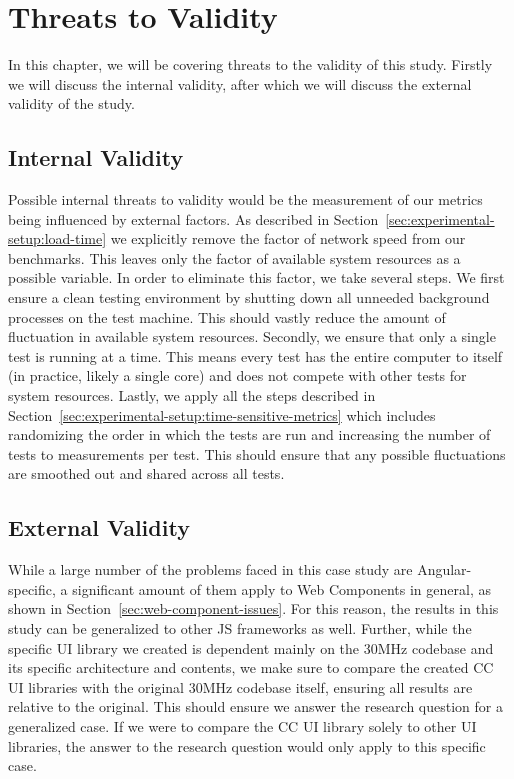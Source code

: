 \chapter{Threats to Validity}\label{chap:threats-to-validity}

In this chapter, we will be covering threats to the validity of this study. Firstly we will discuss the internal validity, after which we will discuss the external validity of the study.

\section{Internal Validity}
Possible internal threats to validity would be the measurement of our metrics being influenced by external factors. As described in Section~\ref{sec:experimental-setup:load-time} we explicitly remove the factor of network speed from our benchmarks. This leaves only the factor of available system resources as a possible variable. In order to eliminate this factor, we take several steps. We first ensure a clean testing environment by shutting down all unneeded background processes on the test machine. This should vastly reduce the amount of fluctuation in available system resources. Secondly, we ensure that only a single test is running at a time. This means every test has the entire computer to itself (in practice, likely a single core) and does not compete with other tests for system resources. Lastly, we apply all the steps described in Section~\ref{sec:experimental-setup:time-sensitive-metrics} which includes randomizing the order in which the tests are run and increasing the number of tests to \numMeasures{} measurements per test. This should ensure that any possible fluctuations are smoothed out and shared across all tests.

\section{External Validity}
While a large number of the problems faced in this case study are Angular-specific, a significant amount of them apply to Web Components in general, as shown in Section~\ref{sec:web-component-issues}. For this reason, the results in this study can be generalized to other JS frameworks as well. Further, while the specific UI library we created is dependent mainly on the 30MHz codebase and its specific architecture and contents, we make sure to compare the created CC UI libraries with the original 30MHz codebase itself, ensuring all results are relative to the original. This should ensure we answer the research question for a generalized case. If we were to compare the CC UI library solely to other UI libraries, the answer to the research question would only apply to this specific case.